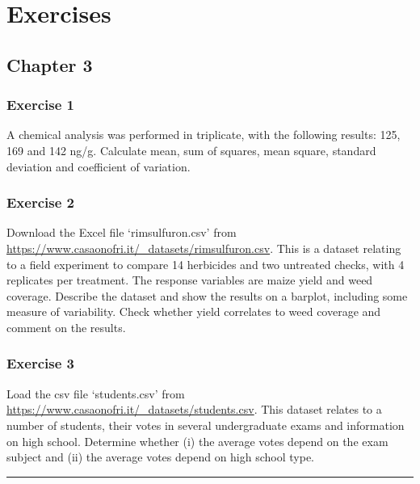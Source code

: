 \documentclass[a4paper,12pt,oneside]{book}
\begin{document}
\hypertarget{exercises}{%
\chapter{Exercises}\label{exercises}}

\hypertarget{chapter-3}{%
\section{Chapter 3}\label{chapter-3}}

\hypertarget{exercise-1}{%
\subsection{Exercise 1}\label{exercise-1}}

A chemical analysis was performed in triplicate, with the following results: 125, 169 and 142 ng/g. Calculate mean, sum of squares, mean square, standard deviation and coefficient of variation.

\hypertarget{exercise-2}{%
\subsection{Exercise 2}\label{exercise-2}}

Download the Excel file `rimsulfuron.csv' from \url{https://www.casaonofri.it/_datasets/rimsulfuron.csv}. This is a dataset relating to a field experiment to compare 14 herbicides and two untreated checks, with 4 replicates per treatment. The response variables are maize yield and weed coverage. Describe the dataset and show the results on a barplot, including some measure of variability. Check whether yield correlates to weed coverage and comment on the results.

\hypertarget{exercise-3}{%
\subsection{Exercise 3}\label{exercise-3}}

Load the csv file `students.csv' from \url{https://www.casaonofri.it/_datasets/students.csv}. This dataset relates to a number of students, their votes in several undergraduate exams and information on high school. Determine whether (i) the average votes depend on the exam subject and (ii) the average votes depend on high school type.

\begin{center}\rule{0.5\linewidth}{0.5pt}\end{center}
\end{document}
